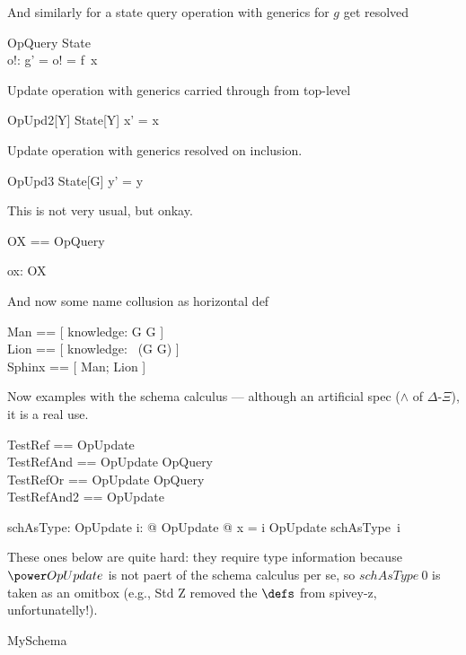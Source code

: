 \documentclass{article}
\begin{document}
And similarly for a state query operation with generics for $g$ get resolved
\begin{schema}{OpQuery}
  \Xi State \\
  o!: \nat
\where
   g' = o! = f~x
\end{schema}

Update operation with generics carried through from top-level
\begin{schema}{OpUpd2}[Y]
   \Delta State[Y]
\where
    x' = x 
\end{schema}

Update operation with generics resolved on inclusion.
\begin{schema}{OpUpd3}
   \Delta State[G]
\where
    y' = y 
\end{schema}

This is not very usual, but onkay.
\begin{zed}
   OX == \pre OpQuery
\end{zed}

\begin{axdef}
   ox: OX
\end{axdef}

And now some name collusion as horizontal def
\begin{zed} 
   Man  == [ knowledge: G \fun G ] \\
   Lion == [ knowledge: \power~(G \cross G) ] \\
   Sphinx == [ Man; Lion ]
\end{zed}

Now examples with the schema calculus --- although an artificial spec ($\land$ of $\Delta$-$\Xi$), it is a real use.
\begin{zed}
   TestRef     == OpUpdate \\
   TestRefAnd  == OpUpdate \land OpQuery \\
   TestRefOr   == OpUpdate \lor OpQuery \\
   TestRefAnd2 == OpUpdate \land [ v: \nat ]
\end{zed}

\begin{axdef}
   schAsType: \nat \fun \power OpUpdate
\where
   \forall i: \nat @ \exists OpUpdate @ x = i \land \theta OpUpdate \in schAsType~i 
\end{axdef}

These ones below are quite hard: they require type information because $\power OpUpdate$ 
is not paert of the schema calculus per se, so $schAsType~0$ is taken as an omitbox
(e.g., Std Z removed the $\defs$ from spivey-z, unfortunatelly!).
%

\begin{zed}
   MySchema 
\end{zed}
\end{document}
